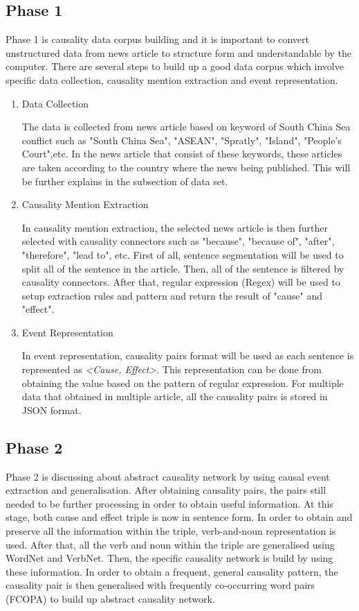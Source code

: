 \documentclass[twoside]{utmthesis}
\begin{document}
\subsection{Phase 1}
Phase 1 is causality data corpus building and it is important to convert unstructured data from news article to structure form and understandable by the computer. There are several steps to build up a good data corpus which involve specific data collection, causality mention extraction and event representation.
\begin{enumerate}[label=(\alph*)]
	\item Data Collection
	
	The data is collected from news article based on keyword of South China Sea conflict such as "South China Sea", "ASEAN", "Spratly", "Island", "People's Court",etc. In the news article that consist of these keywords, these articles are taken according to the country where the news being published. This will be further explains in the subsection of data set. 
	
	\item Causality Mention Extraction
	
	In causality mention extraction, the selected news article is then further selected with causality connectors such as "because", "because of", "after", "therefore", "lead to", etc. First of all, sentence segmentation will be used to split all of the sentence in the article. Then, all of the sentence is filtered by causality connectors. After that, regular expression (Regex) will be used to setup extraction rules and pattern and return the result of "cause" and "effect". 
	 
	\item Event Representation
	
	In event representation, causality pairs format will be used as each sentence is represented as \textit{<Cause, Effect>}. This representation can be done from obtaining the value based on the pattern of regular expression. For multiple data that obtained in multiple article, all the causality pairs is stored in JSON format. 
	
\end{enumerate}
\subsection{Phase 2}
Phase 2 is discussing about abstract causality network by using causal event extraction and generalisation. After obtaining causality pairs, the pairs still needed to be further processing in order to obtain useful information. At this stage, both cause and effect triple is now in sentence form. In order to obtain and preserve all the information within the triple, verb-and-noun representation is used. After that, all the verb and noun within the triple are generalised using WordNet and VerbNet. Then, the specific causality network is build by using these information. In order to obtain a frequent, general causality pattern, the causality pair is then generalised with frequently co-occurring word pairs (FCOPA) to build up abstract causality network. 
\end{document}
